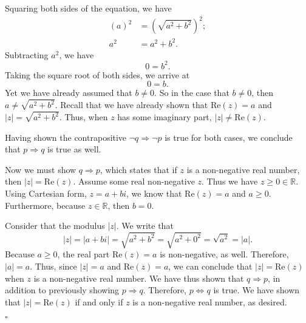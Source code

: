 \documentclass[12pt]{exam}
\begin{document}
\begin{questions}
\begin{parts}
Squaring both sides of the equation, we have
\begin{align*}
(a)^2 &= (\sqrt{a^2 + b^2})^2 ;\\
a^2 &= a^2 + b^2.
\end{align*}
Subtracting $a^2$, we have 
\begin{equation*}
0 = b^2.
\end{equation*}
Taking the square root of both sides, we arrive at 
\begin{equation*}
0 = b.
\end{equation*}
Yet we have already assumed that $b \neq 0$. So in the case that $b \neq 0$, then $a \neq \sqrt{a^2 + b^2}$. Recall that we have already shown that $\textrm{Re}(z) = a$ and  $|z| = \sqrt{a^2 + b^2}$. Thus, when $z$ has some imaginary part, $|z| \neq \textrm{Re}(z)$. 
\par
Having shown the contrapositive $\neg q \Rightarrow \neg p$ is true for both cases, we conclude that $p \Rightarrow q$ is true as well.
\par
Now we must show $q \Rightarrow p$, which states that if $z$ is a non-negative real number, then $|z| = \textrm{Re}(z)$. Assume some real non-negative $z$. Thus we have $z \geq 0 \in \mathbb R$. Using Cartesian form, $z = a +bi$, we know that $\textrm{Re}(z) = a$ and $a \geq 0$. Furthermore, because $z \in \mathbb{R}$, then $b = 0$. 
\par
Consider that the modulus $|z|$. We write that  
\begin{equation*}
|z| = |a+bi| = \sqrt{a^2 + b^2} = \sqrt{a^2 + 0^2} = \sqrt{a^2} = |a|.
\end{equation*} 
Because $a \geq 0$, the real part $\textrm{Re}(z) = a$ is non-negative, as well. Therefore, $|a| = a$. Thus, since $|z| = a$ and $\textrm{Re}(z) = a$, we can conclude that $|z| = \textrm{Re}(z)$ when $z$ is a non-negative real number. We have thus shown that $q \Rightarrow p$, in addition to previously showing $p \Rightarrow q$. Therefore, $p \Leftrightarrow q$ is true. We have shown that $|z| = \textrm{Re}(z)$ if and only if $z$ is a non-negative real number, as desired.
\begin{flushright}
$\square$
\end{flushright}

\end{parts}
\end{questions}
\end{document}
